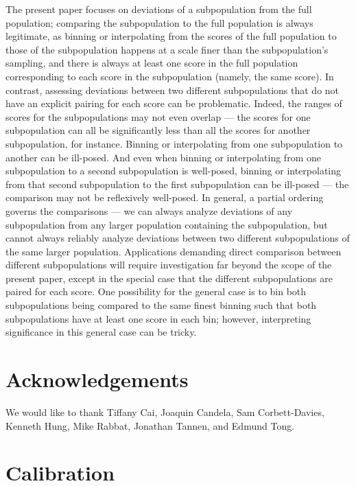 \documentclass{article}
\begin{document}
The present paper focuses on deviations of a subpopulation
from the full population; comparing the subpopulation to the full population
is always legitimate, as binning or interpolating from the scores
of the full population to those of the subpopulation happens at a scale
finer than the subpopulation's sampling, and there is always at least one score
in the full population corresponding to each score in the subpopulation
(namely, the same score). In contrast, assessing deviations
between two different subpopulations that do not have an explicit pairing
for each score can be problematic. Indeed, the ranges of scores
for the subpopulations may not even overlap ---
the scores for one subpopulation can all be significantly
less than all the scores for another subpopulation, for instance.
Binning or interpolating from one subpopulation to another can be ill-posed.
And even when binning or interpolating from one subpopulation
to a second subpopulation is well-posed, binning or interpolating
from that second subpopulation to the first subpopulation can be ill-posed
--- the comparison may not be reflexively well-posed. In general,
a partial ordering governs the comparisons --- we can always analyze deviations
of any subpopulation from any larger population containing the subpopulation,
but cannot always reliably analyze deviations between two different
subpopulations of the same larger population.
Applications demanding direct comparison between different subpopulations
will require investigation far beyond the scope of the present paper,
except in the special case that the different subpopulations are paired
for each score. One possibility for the general case is to bin
both subpopulations being compared to the same finest binning such that
both subpopulations have at least one score in each bin;
however, interpreting significance in this general case can be tricky.



\section*{Acknowledgements}

We would like to thank Tiffany Cai, Joaquin Candela, Sam Corbett-Davies,
Kenneth Hung, Mike Rabbat, Jonathan Tannen, and Edmund Tong.



\appendix
\section{Calibration}
\label{calibration}
\end{document}
